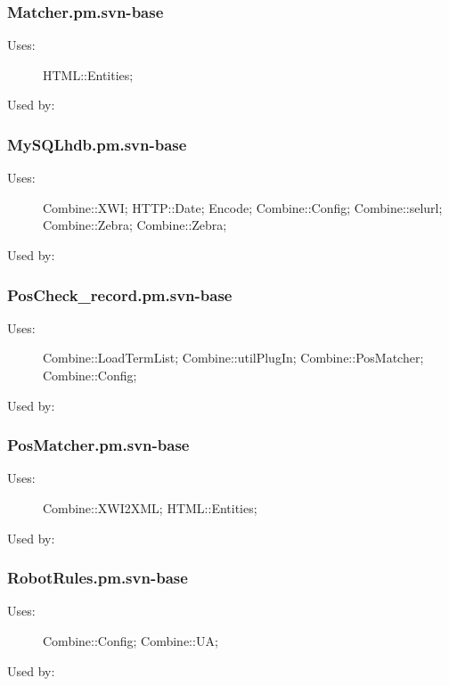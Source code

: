 \subsubsection{Matcher.pm.svn-base}
\begin{description}
\item[Uses:] HTML::Entities; 

\item[Used by:] 

\end{description}
\subsubsection{MySQLhdb.pm.svn-base}
\begin{description}
\item[Uses:] Combine::XWI; HTTP::Date; Encode; Combine::Config; Combine::selurl; Combine::Zebra; Combine::Zebra; 

\item[Used by:] 

\end{description}
\subsubsection{PosCheck\_record.pm.svn-base}
\begin{description}
\item[Uses:] Combine::LoadTermList; Combine::utilPlugIn; Combine::PosMatcher; Combine::Config; 

\item[Used by:] 

\end{description}
\subsubsection{PosMatcher.pm.svn-base}
\begin{description}
\item[Uses:] Combine::XWI2XML; HTML::Entities; 

\item[Used by:] 

\end{description}
\subsubsection{RobotRules.pm.svn-base}
\begin{description}
\item[Uses:] Combine::Config; Combine::UA; 

\item[Used by:] 

\end{description}
